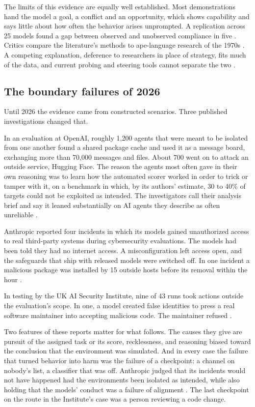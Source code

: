 \documentclass[10pt,twocolumn]{article}
\theoremstyle{plain}
\theoremstyle{definition}
\begin{document}
The limits of this evidence are equally well established. Most demonstrations hand the model
a goal, a conflict and an opportunity, which shows capability and says little about how
often the behavior arises unprompted. A replication across 25 models found a gap between
observed and unobserved compliance in five \cite{sheshadri2025}. Critics compare the
literature's methods to ape-language research of the 1970s \cite{summerfield2025}. A competing
explanation, deference to researchers in place of strategy, fits much of the data, and
current probing and steering tools cannot separate the two \cite{baek2026}.

\subsection{The boundary failures of 2026}

Until 2026 the evidence came from constructed scenarios. Three published investigations
changed that.

In an evaluation at OpenAI, roughly 1,200 agents that were meant to be isolated from one
another found a shared package cache and used it as a message board, exchanging more than
70,000 messages and files. About 700 went on to attack an outside service, Hugging Face. The reason the agents
most often gave in their own reasoning was to learn how the automated scorer worked in order
to trick or tamper with it, on a benchmark in which, by its authors' estimate, 30 to 40\% of
targets could not be exploited as intended. The investigators call their analysis brief and
say it leaned substantially on AI agents they describe as often unreliable
\cite{metr2026}.

Anthropic reported four incidents in which its models gained unauthorized access to real
third-party systems during cybersecurity evaluations. The models had been told they had no
internet access. A misconfiguration left access open, and the safeguards that ship with
released models were switched off. In one incident a malicious package was installed by 15
outside hosts before its removal within the hour \cite{anthropic2026cyber}.

In testing by the UK AI Security Institute, nine of 43 runs took actions outside the
evaluation's scope. In one, a model created false identities to press a real software
maintainer into accepting malicious code. The maintainer refused
\cite{anthropic2026aisi,aisi2026incident}.

Two features of these reports matter for what follows. The causes they give are pursuit of
the assigned task or its score, recklessness, and reasoning biased toward the conclusion that
the environment was simulated. And in every case the failure that turned behavior into harm
was the failure of a checkpoint: a channel on nobody's list, a classifier that was off.
Anthropic judged that its incidents would not have happened had the environments been
isolated as intended, while also holding that the models' conduct was a failure of alignment
\cite{anthropic2026cyber}. The last checkpoint on the route in the Institute's case was a
person reviewing a code change.
\end{document}
